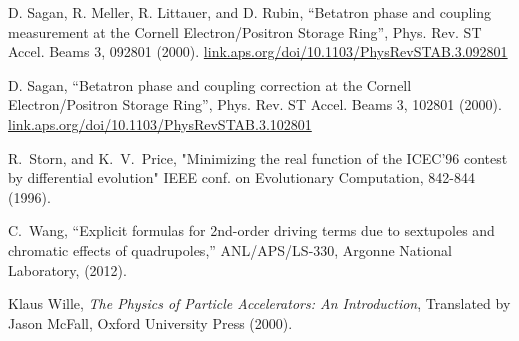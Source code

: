 \begin{thebibliography}{99}
D. Sagan, R. Meller, R. Littauer, and D. Rubin,
``Betatron phase and coupling measurement at the Cornell Electron/Positron Storage Ring'', 
Phys. Rev. ST Accel. Beams 3, 092801 (2000).
\hfill\break
\hspace*{20pt}
\url{link.aps.org/doi/10.1103/PhysRevSTAB.3.092801}

D. Sagan,
``Betatron phase and coupling correction at the Cornell Electron/Positron
Storage Ring'', Phys. Rev. ST Accel. Beams 3, 102801 (2000).
\hfill\break
\hspace*{20pt}
\url{link.aps.org/doi/10.1103/PhysRevSTAB.3.102801}

R.~Storn, and K.~V.~Price, "Minimizing the real function of the
ICEC'96 contest by differential evolution" IEEE conf. on Evolutionary
Computation, 842-844 (1996).

C.~Wang,
``Explicit formulas for 2nd-order driving terms due to sextupoles and
chromatic effects of quadrupoles,''
ANL/APS/LS-330, Argonne National Laboratory, (2012).

Klaus Wille, {\em The Physics of Particle Accelerators: An Introduction},
Translated by Jason McFall, Oxford University Press (2000).

\end{thebibliography}
